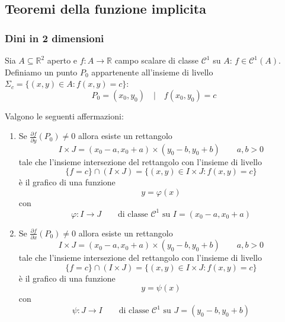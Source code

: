\documentclass[x11names]{article}
\begin{document}
	\subsection{Teoremi della funzione implicita}
	\begin{center}
		\colorbox{myred}{\begin{minipage}{5.75in}
				\begin{redes}{}
					\subsubsection{\textbf{Dini in 2 dimensioni}}
					Sia \(A \subseteq \mathbb{R}^2\) aperto e \(f: A\to \mathbb{R}\) campo scalare di classe \(\mathcal{C^1}\) su \(A\): \(f\in \mathcal{C}^1(A)\). \\
					
					Definiamo un punto \(P_{0}\) appartenente all'insieme di livello \(\Sigma_c = \{(x,y) \in A : f(x,y) = c\}\):
					\[
					P_{0} = (x_{0},y_{0}) \quad | \quad f(x_{0},y_{0}) = c
					\]
					
					Valgono le seguenti affermazioni:
					\begin{enumerate}
						\item Se \(\frac{\partial f}{\partial y}(P_{0}) \neq 0\) allora esiste un rettangolo 
						\[ 
						I\times J = (x_{0} - a, x_{0} + a) \times (y_{0} - b, y_{0} + b) \qquad a,b > 0
						\]
						tale che l'insieme intersezione del rettangolo con l'insieme di livello
						\[ 
						\{f=c\} \cap (I\times J) = \{(x,y) \in I \times J : f(x,y) = c\}
						\]
						è il grafico di una funzione 
						\[ 
						y = \varphi(x)
						\]
						con
						\[ 
						\varphi : I \to J \qquad \text{di classe } \mathcal{C}^1 \text{ su } I = (x_{0}-a,x_{0}+a)
						\]
						\item Se \(\frac{\partial f}{\partial x}(P_{0}) \neq 0\) allora esiste un rettangolo 
						\[ 
						I\times J = (x_{0} - a, x_{0} + a) \times (y_{0} - b, y_{0} + b) \qquad a,b > 0
						\]
						tale che l'insieme intersezione del rettangolo con l'insieme di livello
						\[ 
						\{f=c\} \cap (I\times J) = \{(x,y) \in I \times J : f(x,y) = c\}
						\]
						è il grafico di una funzione 
						\[ 
						y = \psi(x)
						\]
						con
						\[ 
						\psi : J \to I \qquad \text{di classe } \mathcal{C}^1 \text{ su } J = (y_{0}-b,y_{0}+b)
						\]
					\end{enumerate}
				\end{redes}
		\end{minipage}}        
	\end{center}
	
\end{document}
